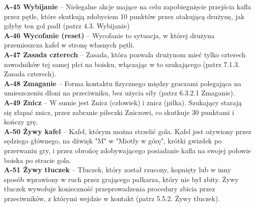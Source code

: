\documentclass[12pt,a4paper]{article}
\begin{document}
\textbf{A-45 Wybijanie} – Nielegalne akcje mające na celu zapobiegnięcie przejścia kafla przez pętle, które skutkują zdobyciem 10 punktów przez atakującą drużynę, jak gdyby ten gol padł (patrz 4.3. Wybijanie)\\
\textbf{A-46 Wycofanie (reset)} – Wycofanie to sytuacja, w której drużyna przemieszcza kafel w stronę własnych pętli.\\
\textbf{A-47 Zasada czterech} – Zasada, która pozwala drużynom mieć tylko czterech zawodników tej samej płci na boisku, włączając w to szukającego (patrz 7.1.3. Zasada czterech).\\
\textbf{A-48 Zmaganie} – Forma kontaktu fizycznego między graczami polegająca na umieszczeniu dłoni na przeciwniku, bez użycia siły (patrz 6.3.2.1 Zmaganie).\\
\textbf{A-49 Znicz} – W sumie jest Znicz (człowiek) i znicz (piłka). Szukający starają się złapać znicz, przez zabranie piłeczki Zniczowi, co skutkuje 30 punktami i kończy grę.\\
\textbf{A-50 Żywy kafel} – Kafel, którym można strzelić gola. Kafel jest ożywiony przez sędziego głównego, na dźwięk "M" w "Miotły w górę", krótki gwizdek po przerwaniu gry, i przez obrońcę zdobywającego posiadanie kafla na swojej połowie boiska po stracie gola.\\
\textbf{A-51 Żywy tłuczek} – Tłuczek, który został rzucony, kopnięty lub w inny sposób wprawiony w ruch przez grającego pałkarza, który nie był zbity. Żywy tłuczek wywołuje konieczność przeprowadzenia procedury zbicia przez przeciwników, z którymi wejdzie w kontakt (patrz 5.5.2. Żywy tłuczek). \\

\newpage
{}

\end{document}
